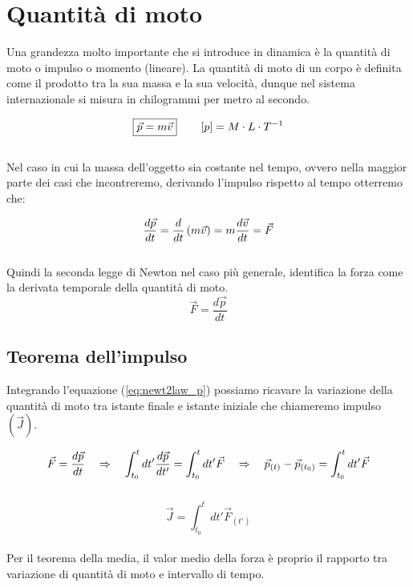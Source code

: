 \section{Quantità di moto}
Una grandezza molto importante che si introduce in dinamica è la quantità
di moto o impulso o momento (lineare). La quantità di moto di un corpo è
definita come il prodotto tra la sua massa e la sua velocità, dunque nel
sistema internazionale si misura in chilogrammi per metro al secondo.

\begin{equation}
    \boxed{\vec p = m\vec v}\quad\quad \left[ p\right] = M\cdot L\cdot T^{-1}
\label{eq:pulse_def}
\end{equation}
\\
Nel caso in cui la massa dell'oggetto sia costante nel tempo, ovvero nella
maggior parte dei casi che incontreremo, derivando l'impulso rispetto al
tempo otterremo che:

\begin{equation}
    \frac{d\vec p}{dt} = \frac d{dt}\left( m\vec v\right) =
    m\frac{d\vec v}{dt} =\vec F
\end{equation}
\\
Quindi la seconda legge di Newton nel caso più generale, identifica la
forza come la derivata temporale della quantità di moto.
\begin{equation}
    \boxed{\vec F = \frac{d\vec p}{dt}}
\label{eq:newt2law_p}
\end{equation}
\subsection{Teorema dell'impulso}
Integrando l'equazione (\ref{eq:newt2law_p}) possiamo ricavare la variazione della
quantità di moto tra istante finale e istante iniziale che chiameremo impulso $(\vec J)$.

\begin{equation}
    \vec F = \frac{d\vec p}{dt}\quad\Rightarrow\quad \int_{t_0}^tdt'\frac{d\vec p}{dt'} =
    \int_{t_0}^tdt'\vec F\quad\Rightarrow\quad \vec p_{(t)} - \vec p_{\left( t_0\right)} =
    \int_{t_0}^tdt'\vec F
\end{equation}
\\
\begin{equation}
    \boxed{\vec J = \int_{t_0}^tdt'\vec F_{(t')}}
\label{eq:pulse_theorem}
\end{equation}
\\
Per il teorema della media, il valor medio della forza  è proprio il rapporto tra variazione di quantità di moto e intervallo di tempo.

